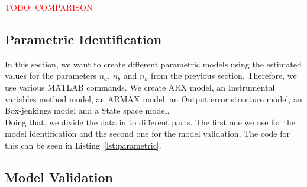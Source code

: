 \documentclass{scrartcl}
\newcommand*{\matlabcode}[3]{\begin{figure}[h!]\end{figure}}
\begin{document}
\textcolor{red}{TODO: COMPARISON}

\newpage
\subsection{Parametric Identification}

In this section, we want to create different parametric models using the estimated values for the parameters $n_a$, $n_b$ and $n_k$ from the previous section. Therefore, we use various MATLAB commands. We create ARX model, an Instrumental variables method model, an ARMAX model, an Output error structure model, an  Box-jenkings model and a State space model.\\
Doing that, we divide the data in to different parts. The first one we use for the model identification and the second one for the model validation. 
The code for this can be seen in Listing~\ref{lst:parametric}.  

\matlabcode{../matlab/ce2/parametric_identification.m}{Code for partitioning the data and creating the models}{lst:parametric}

\subsection{Model Validation}
\end{document}
